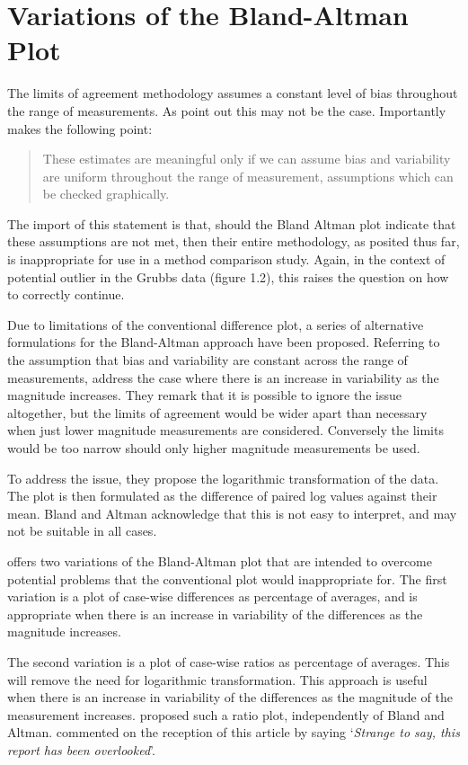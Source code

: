 \documentclass[12pt, a4paper]{report}
\theoremstyle{plain}
\theoremstyle{definition}
\theoremstyle{remark}
\begin{document}
\section{Variations of the Bland-Altman Plot} 
The limits of agreement methodology assumes a constant level of bias throughout the range of measurements. As \citet*{BA86} point out this may not be the case. 
Importantly \citet{BA99} makes the following point:
\begin{quote}These estimates are meaningful only if we can assume
	bias and variability are uniform throughout the range of
	measurement, assumptions which can be checked graphically.
\end{quote}

The import of this statement is that, should the Bland Altman plot indicate that these assumptions are not met, then their
entire methodology, as posited thus far, is inappropriate for use
in a method comparison study. Again, in the context of potential
outlier in the Grubbs data (figure 1.2), this raises the question
on how to correctly continue. 

Due to limitations of the conventional difference plot, a series of alternative formulations for the Bland-Altman approach have been proposed. Referring to the assumption that bias and variability are constant across the range of measurements, \citet{BA99} address the case where there is an increase in variability as the magnitude increases. They remark that it is possible to ignore the issue altogether, but the limits of agreement would be wider apart than necessary when just lower magnitude measurements are considered. Conversely the limits would be too narrow should only higher magnitude measurements be used. 

To address the issue, they propose the logarithmic transformation of the data. The plot is then formulated as the difference of paired log values against their mean. Bland and Altman acknowledge that this is not easy to interpret, and may not be suitable in all cases.

\citet{BA99} offers two variations of the Bland-Altman plot that are intended to overcome potential problems that the conventional
plot would inappropriate for. The first variation is a plot of case-wise differences as percentage of averages, and is
appropriate when there is an increase in variability of the differences as the magnitude increases. 

The second variation is a
plot of case-wise ratios as percentage of averages. This will remove the need for logarithmic transformation. This approach is useful
when there is an increase in variability of the differences as the magnitude of the measurement increases. \citet{Eksborg} proposed
such a ratio plot, independently of Bland and Altman. \citet{Dewitte} commented on the reception of this article by saying `\textit{Strange to say, this report has been overlooked}'.
	
\end{document}
